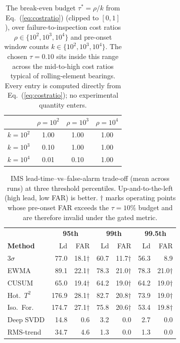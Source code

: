 \documentclass[IJPHM, 2026, 0]{PHMSociety}
\begin{document}
\begin{table}[t] \small
	\begin{center}
	\caption{The break-even budget $\tau^* = \rho/k$ from Eq.~(\ref{eq:costratio}) (clipped to $[0,1]$), over failure-to-inspection cost ratios $\rho \in \{10^2, 10^3, 10^4\}$ and pre-onset window counts $k \in \{10^2, 10^3, 10^4\}$. The chosen $\tau=0.10$ sits inside this range across the mid-to-high cost ratios typical of rolling-element bearings. Every entry is computed directly from Eq.~(\ref{eq:costratio}); no experimental quantity enters.}
	\label{tab:taugrid}
	\begin{tabular}{l c c c}
		\hline \hline
		 & \textbf{$\rho{=}10^2$} & \textbf{$\rho{=}10^3$} & \textbf{$\rho{=}10^4$} \\
		\hline
		$k{=}10^2$ & 1.00 & 1.00 & 1.00 \\
		$k{=}10^3$ & 0.10 & 1.00 & 1.00 \\
		$k{=}10^4$ & 0.01 & 0.10 & 1.00 \\
		\hline \hline
	\end{tabular}
	\end{center}
\end{table}

\begin{table}[t] \small
	\begin{center}
	\caption{IMS lead-time--vs--false-alarm trade-off (mean across runs) at three threshold percentiles. Up-and-to-the-left (high lead, low FAR) is better. $\dagger$ marks operating points whose pre-onset FAR exceeds the $\tau=10\%$ budget and are therefore invalid under the gated metric.}
	\label{tab:tradeoff}
	\begin{tabular}{l r r r r r r}
		\hline \hline
		 & \multicolumn{2}{c}{\textbf{95th}} & \multicolumn{2}{c}{\textbf{99th}} & \multicolumn{2}{c}{\textbf{99.5th}} \\
		\textbf{Method} & Ld & FAR & Ld & FAR & Ld & FAR \\
		\hline
		$3\sigma$ & 77.0 & 18.1$\dagger$ & 60.7 & 11.7$\dagger$ & 56.3 & 8.9 \\
		EWMA & 89.1 & 22.1$\dagger$ & 78.3 & 21.0$\dagger$ & 78.3 & 21.0$\dagger$ \\
		CUSUM & 65.0 & 19.4$\dagger$ & 64.2 & 19.0$\dagger$ & 64.2 & 19.0$\dagger$ \\
		Hot.\ $T^2$ & 176.9 & 28.1$\dagger$ & 82.7 & 20.8$\dagger$ & 73.9 & 19.0$\dagger$ \\
		Iso.\ For. & 174.7 & 27.1$\dagger$ & 75.8 & 20.6$\dagger$ & 53.4 & 19.8$\dagger$ \\
		Deep SVDD & 14.8 & 0.6 & 3.2 & 0.0 & 2.7 & 0.0 \\
		RMS-trend & 34.7 & 4.6 & 1.3 & 0.0 & 1.3 & 0.0 \\
		\hline \hline
	\end{tabular}
	\end{center}
\end{table}
\end{document}
